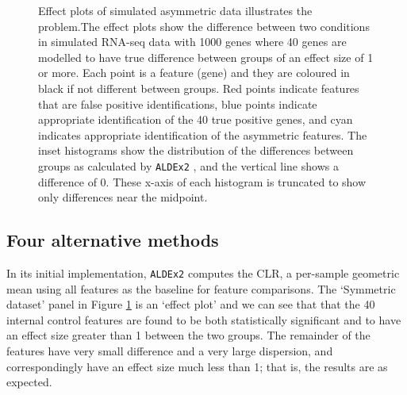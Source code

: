 \documentclass[graybox]{svmult}
\begin{document}
\begin{figure}[b]
%
%
\caption{Effect plots of simulated asymmetric data illustrates the problem.The effect plots show the difference between two conditions in simulated RNA-seq data with 1000 genes where 40 genes are modelled to have true difference between groups of an effect size of 1 or more. Each point is a feature (gene) and they are coloured in black if not different between groups. Red points indicate features that are false positive identifications, blue points indicate appropriate identification of the 40 true positive genes, and cyan indicates appropriate identification of the asymmetric features. The inset histograms show the distribution of the differences between groups as calculated by  \texttt{ALDEx2} , and the vertical line shows a difference of 0. These x-axis of each histogram is truncated to show only differences near the midpoint.}
\label{Fig:f1a}       %
\end{figure}



\subsection*{Four alternative methods}
\label{subsec:2.2}

In its initial implementation, \texttt{ALDEx2} computes the CLR, a per-sample geometric mean using all features as the baseline for feature comparisons. The `Symmetric dataset' panel in Figure \ref{Fig:f1a} is an `effect plot' \cite{gloor:effect} and we can see that that the 40 internal control features are found to be both statistically significant and to have an effect size greater than 1 between the two groups. The remainder of the features have very small difference and a very large dispersion, and correspondingly have an effect size much less than 1; that is, the results are as expected. 
\end{document}
